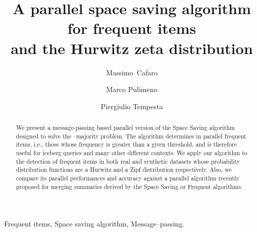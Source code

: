 \documentclass[final,3p,times]{elsarticle}
\begin{document}
\begin{frontmatter}
\title{A parallel space saving algorithm for frequent items  \\ and the Hurwitz zeta distribution}
\author [unile] {Massimo~Cafaro}
\author [unile] {Marco Pulimeno}
\author [comp] {Piergiulio Tempesta}
\address[unile]{University of Salento, Lecce, Italy}
\address[comp]{Departamento de F\'{\i}sica Te\'{o}rica II, Facultad de F\'{\i}sicas, Universidad
Complutense, 28040 -- Madrid, Spain and Instituto de Ciencias Matem\'aticas, C/ Nicol\'as Cabrera, No 13--15, 28049 Madrid, Spain}


\begin{abstract} We present a message-passing based parallel version of the Space Saving algorithm designed to solve the --majority problem. The algorithm determines in parallel frequent items, i.e., those whose frequency is greater than a given threshold, and is therefore useful for iceberg queries and many other different contexts. We apply our algorithm to the detection of frequent items in both real and synthetic datasets whose probability distribution functions are a Hurwitz and a Zipf distribution respectively. Also, we compare its parallel performances and accuracy against a parallel algorithm recently proposed for merging summaries derived by the Space Saving or Frequent algorithms.
\end{abstract}

\begin{keyword}
Frequent items, Space saving algorithm, Message--passing.
\end{keyword}

\newtheorem{thm}{Theorem}
\newtheorem{lem}[thm]{Lemma}
\newtheorem{prop}[thm]{Proposition}
\newtheorem*{cor}{Corollary}

\newtheorem{conj}{Conjecture}
\newtheorem{exmp}{Example}
\newtheorem{case}{Case}

\end{frontmatter}
\end{document}
